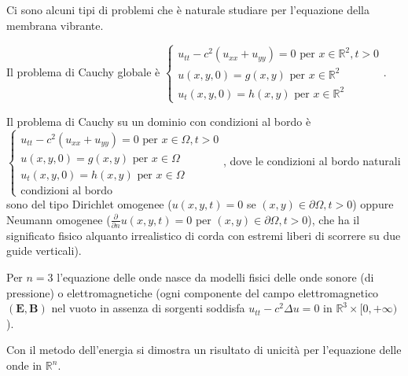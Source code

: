 \documentclass{article}
\begin{document}
Ci sono alcuni tipi di problemi che \`{e} naturale studiare per l'equazione
della membrana vibrante.

Il problema di Cauchy globale \`{e} $\left\{ 
\begin{array}{c}
u_{tt}-c^{2}\left( u_{xx}+u_{yy}\right) =0\text{ per }x\in 
\mathbb{R}
^{2},t>0 \\ 
u\left( x,y,0\right) =g\left( x,y\right) \text{ per }x\in 
\mathbb{R}
^{2} \\ 
u_{t}\left( x,y,0\right) =h\left( x,y\right) \text{ per }x\in 
\mathbb{R}
^{2}%
\end{array}%
\right. $.

Il problema di Cauchy su un dominio con condizioni al bordo \`{e} $\left\{ 
\begin{array}{c}
u_{tt}-c^{2}\left( u_{xx}+u_{yy}\right) =0\text{ per }x\in \Omega ,t>0 \\ 
u\left( x,y,0\right) =g\left( x,y\right) \text{ per }x\in \Omega \\ 
u_{t}\left( x,y,0\right) =h\left( x,y\right) \text{ per }x\in \Omega \\ 
\text{condizioni al bordo}%
\end{array}%
\right. $, dove le condizioni al bordo naturali sono del tipo Dirichlet
omogenee ($u\left( x,y,t\right) =0$ se $\left( x,y\right) \in \partial
\Omega ,t>0$) oppure Neumann omogenee ($\frac{\partial }{\partial n}u\left(
x,y,t\right) =0$ per $\left( x,y\right) \in \partial \Omega ,t>0$), che ha
il significato fisico alquanto irrealistico di corda con estremi liberi di
scorrere su due guide verticali).

Per $n=3$ l'equazione delle onde nasce da modelli fisici delle onde sonore
(di pressione) o elettromagnetiche (ogni componente del campo
elettromagnetico $\left( \mathbf{E,B}\right) $ nel vuoto in assenza di
sorgenti soddisfa $u_{tt}-c^{2}\Delta u=0$ in $%
\mathbb{R}
^{3}\times \lbrack 0,+\infty )$).

Con il metodo dell'energia si dimostra un risultato di unicit\`{a} per
l'equazione delle onde in $%
\mathbb{R}
^{n}$.
\end{document}
